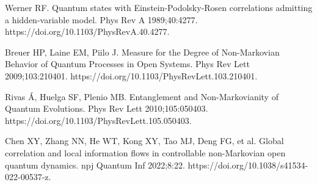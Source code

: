 \documentclass[
showpacs,  %
showkeys,  %
aps,       %
amsthm,    %
amsmath,   %
amsfonts,  %
amssymb    %
]{revtex4-1}          %
\begin{document}
\begin{thebibliography}{}
Werner RF. Quantum states with Einstein-Podolsky-Rosen correlations admitting a hidden-variable model. Phys Rev A 1989;40:4277. https://doi.org/10.1103/PhysRevA.40.4277.

Breuer HP, Laine EM, Piilo J. Measure for the Degree of Non-Markovian Behavior of Quantum Processes in Open Systems. Phys Rev Lett 2009;103:210401. https://doi.org/10.1103/PhysRevLett.103.210401.

Rivas \'{A}, Huelga SF, Plenio MB. Entanglement and Non-Markovianity of Quantum Evolutions. Phys Rev Lett 2010;105:050403. https://doi.org/10.1103/PhysRevLett.105.050403.

Chen XY, Zhang NN, He WT, Kong XY, Tao MJ, Deng FG, et al. Global correlation and local information flows in controllable non-Markovian open quantum dynamics. npj Quantum Inf 2022;8:22. https://doi.org/10.1038/s41534-022-00537-z.


\end{thebibliography}
\end{document}
